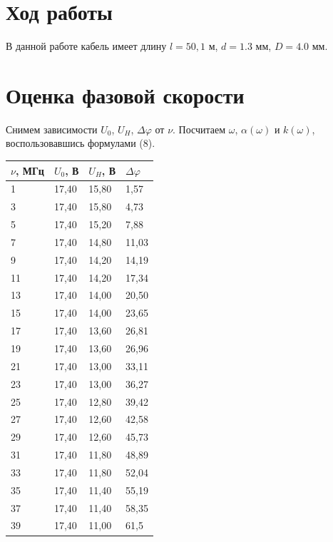 \documentclass[a4paper,12pt]{article}
\theoremstyle{definition}
\begin{document}
\section*{Ход работы}
	В данной работе кабель имеет длину $l=50,1$ м, $d = 1.3$ мм, $D = 4.0$ мм.
 	

\section{Оценка фазовой скорости}

	Снимем зависимости $U_0$, $U_H$, $\Delta \varphi$ от $\nu$. 
	Посчитаем $\omega$, $\alpha(\omega)$ и $k(\omega)$, 
	воспользовавшись формулами (8).

	\begin{table}[h]
		\centering
		\begin{tabular}{|l|l|l|l|} \hline
			$\nu$, МГц 
					& $U_{0}$, В 
						   & $U_{H}$, В 
								  & $\Delta \varphi$  \\ \hline
			1       & 17,40 & 15,80 &  1,57\\ \hline
			3       & 17,40 & 15,80 &  4,73\\ \hline
			5       & 17,40 & 15,20 & 7,88\\ \hline
			7       & 17,40 & 14,80 & 11,03\\ \hline
			9       & 17,40 & 14,20 & 14,19\\ \hline
			11      & 17,40 & 14,20 & 17,34\\ \hline
			13      & 17,40 & 14,00 & 20,50\\ \hline
			15      & 17,40 & 14,00 & 23,65\\ \hline
			17      & 17,40 & 13,60 & 26,81\\ \hline
			19      & 17,40 & 13,60 & 26,96\\ \hline
			21      & 17,40 & 13,00 & 33,11\\ \hline
			23      & 17,40 & 13,00 & 36,27\\ \hline
			25      & 17,40 & 12,80 & 39,42\\ \hline
			27      & 17,40 & 12,60 & 42,58\\ \hline
			29      & 17,40 & 12,60 & 45,73\\
            \hline
			31      & 17,40 & 11,80 & 48,89\\
            \hline
			33      & 17,40 & 11,80 & 52,04\\ 
            \hline
			35      & 17,40 & 11,40 & 55,19\\ 
            \hline
			37      & 17,40 & 11,40 & 58,35\\ 
            \hline
			39      & 17,40 & 11,00 & 61,5\\ 
            \hline
		\end{tabular}
	\end{table}
\end{document}
